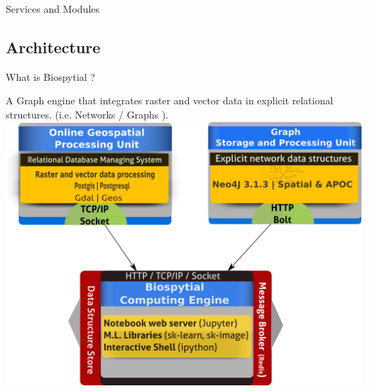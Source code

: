 \documentclass{beamer}
\begin{document}
\begin{frame}{Services and Modules}
\end{frame}

\subsection{Architecture}
\begin{frame}{What is Biospytial ?}
\begin{block}{A Graph engine}
that integrates raster and vector data in explicit relational structures. (i.e. Networks / Graphs ).\\
\centering
\includegraphics[scale=0.35]{biospytial-stack.png}

\end{block}
\end{frame}
\end{document}
